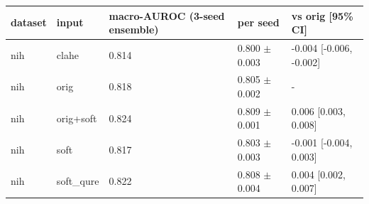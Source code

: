 \begin{tabular}{lllll}
\toprule
dataset & input & macro-AUROC (3-seed ensemble) & per seed & vs orig [95\% CI] \\
\midrule
nih & clahe & 0.814 & 0.800 $\pm$ 0.003 & -0.004 [-0.006, -0.002] \\
nih & orig & 0.818 & 0.805 $\pm$ 0.002 & - \\
nih & orig+soft & 0.824 & 0.809 $\pm$ 0.001 & 0.006 [0.003, 0.008] \\
nih & soft & 0.817 & 0.803 $\pm$ 0.003 & -0.001 [-0.004, 0.003] \\
nih & soft\_qure & 0.822 & 0.808 $\pm$ 0.004 & 0.004 [0.002, 0.007] \\
\bottomrule
\end{tabular}
